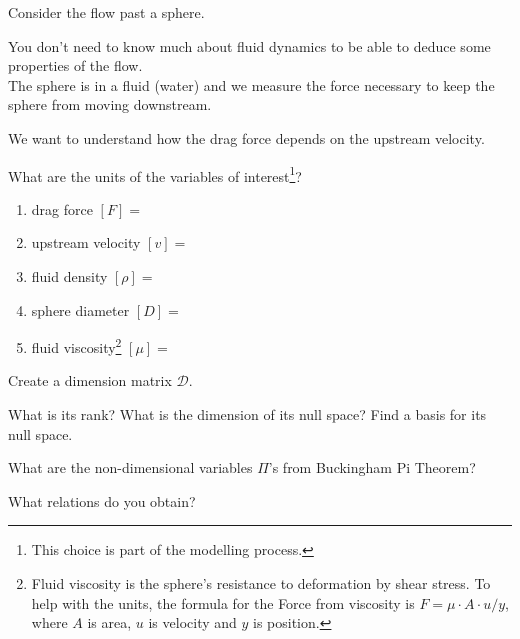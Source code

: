 \documentclass{workbook}
\begin{document}
\begin{slide}

\question

\begin{problem}

Consider the flow past a sphere.

\begin{center}
\end{center}

You don't need to know much about fluid dynamics to be able to deduce some properties of the flow. \\

The sphere is in a fluid (water) and we measure the force necessary to keep the sphere from moving downstream.

We want to understand how the drag force depends on the upstream velocity.
\end{problem}

\begin{parts}
	\item What are the units of the variables of interest\footnote{This choice is part of the modelling process.}?
	\begin{enumerate}
		\item drag force $[F]=$
		\item upstream velocity $[v]=$
		\item fluid density $[\rho]=$
		\item sphere diameter $[D]=$
		\item fluid viscosity\footnote{Fluid viscosity is the sphere's resistance to deformation by shear stress. To help with the units, the formula for the Force from viscosity is $F =\mu \cdot A \cdot u/y$, where $A$ is area, $u$ is velocity and $y$ is position.} $[\mu]= $
	\end{enumerate}
	\item Create a dimension matrix $\mathcal{D}$.
	\item What is its rank? What is the dimension of its null space? Find a basis for its null space.
	\item What are the non-dimensional variables $\Pi$'s from Buckingham Pi Theorem?
	\item What relations do you obtain?
		
\end{parts}
	
\end{slide}
\end{document}
